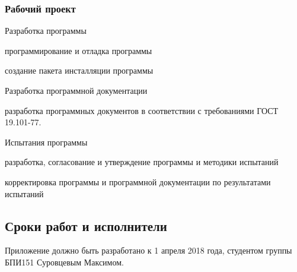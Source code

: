 \subsubsection{Рабочий проект}
\begin{my_enumerate}
    \item Разработка программы
        \begin{my_enumerate}
            \item программирование и отладка программы
            \item создание пакета инсталляции программы
        \end{my_enumerate}
    \item Разработка программной документации
        \begin{my_enumerate}
            \item разработка программных документов в соответствии с требованиями ГОСТ 19.101-77.
        \end{my_enumerate}
     \item Испытания программы
           \begin{my_enumerate}
             \item разработка, согласование и утверждение программы и методики испытаний
            \item корректировка программы и программной документации по результатами испытаний
         \end{my_enumerate}
\end{my_enumerate}

\subsection{Сроки работ и исполнители}

Приложение должно быть разработано к 1 апреля 2018 года, студентом группы БПИ151 
Суровцевым Максимом.


